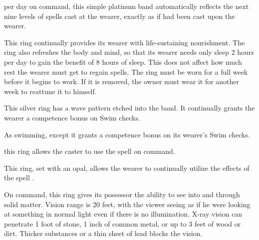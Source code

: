 
  per day on command, this simple platinum band automatically reflects the next nine levels of spells cast at the wearer, exactly as if  had been cast upon the wearer.


 This ring continually provides its wearer with life-sustaining nourishment. The ring also refreshes the body and mind, so that its wearer needs only sleep 2 hours per day to gain the benefit of 8 hours of sleep. This does not affect how much rest the wearer must get to regain spells. The ring must be worn for a full week before it begins to work. If it is removed, the owner must wear it for another week to reattune it to himself.


 This silver ring has a wave pattern etched into the band. It continually grants the wearer a  competence bonus on Swim checks.


 As swimming, except it grants a  competence bonus on its wearer's Swim checks.


  this ring allows the caster to use the spell  on command.


 This ring, set with an opal, allows the wearer to continually utilize the effects of the spell .


 On command, this ring gives its possessor the ability to see into and through solid matter. Vision range is 20 feet, with the viewer seeing as if he were looking at something in normal light even if there is no illumination. X-ray vision can penetrate 1 foot of stone, 1 inch of common metal, or up to 3 feet of wood or dirt. Thicker substances or a thin sheet of lead blocks the vision.

